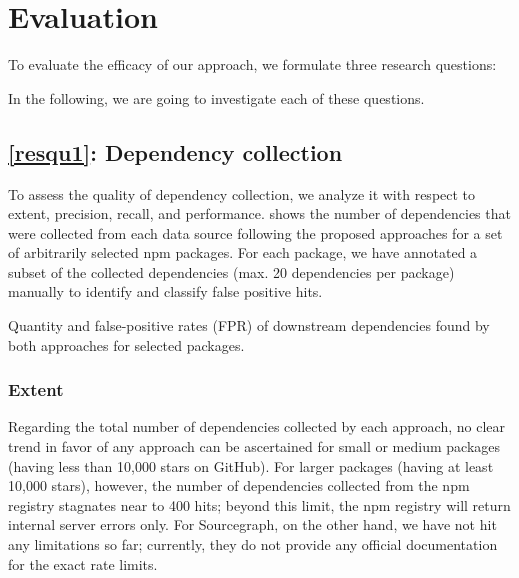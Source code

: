\section{Evaluation}
\label{sec:evaluation}

To evaluate the efficacy of our approach, we formulate three research questions:


In the following, we are going to investigate each of these questions.

\subsection{\ref{resqu1}: Dependency collection}
\label{sec:evaluation/resqu1}

To assess the quality of dependency collection, we analyze it with respect to extent, precision, recall, and performance.
 shows the number of dependencies that were collected from each data source following the proposed approaches for a set of arbitrarily selected npm packages.
For each package, we have annotated a subset of the collected dependencies (max. 20 dependencies per package) manually to identify and classify false positive hits.

\begin{table}
	\centering
	\small
	
	\caption{Quantity and false-positive rates (FPR) of downstream dependencies found by both approaches for selected packages.}
	\label{tab:evaluation/resqu1/quantities}
\end{table}

\subsubsection{Extent}
\label{sec:evaluation/resqu1/extent}

Regarding the total number of dependencies collected by each approach, no clear trend in favor of any approach can be ascertained for small or medium packages (having less than 10,000 stars on GitHub).
For larger packages (having at least 10,000 stars), however, the number of dependencies collected from the npm registry stagnates near to 400 hits; beyond this limit, the npm registry will return internal server errors only.
For Sourcegraph, on the other hand, we have not hit any limitations so far; currently, they do not provide any official documentation for the exact rate limits.

